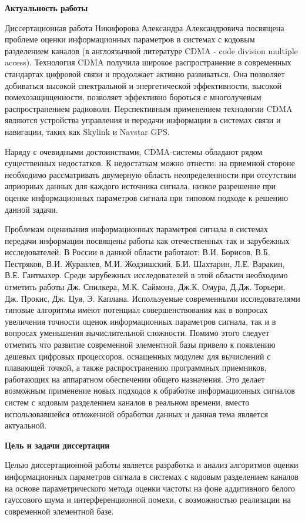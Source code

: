 {\bf{Актуальность работы}}

Диссертационная работа Никифорова Александра Александровича посвящена проблеме оценки информационных параметров в системах с кодовым разделением каналов
(в англоязычной литературе CDMA - code division multiple access).
Технология CDMA получила широкое распространение в современных стандартах цифровой связи и продолжает активно развиваться. Она позволяет добиваться высокой
спектральной и энергетической эффективности, высокой помехозащищенности, позволяет эффективно бороться с многолучевым распространением радиоволн.
Перспективным применением технологии CDMA являются устройства управления и передачи информации в системах связи и навигации, таких как Skylink и Navstar GPS. 

Наряду с очевидными достоинствами, CDMA-системы обладают рядом существенных недостатков. К недостаткам можно отнести: на приемной стороне необходимо рассматривать
двумерную область неопределенности при отсутствии априорных данных для каждого источника сигнала, низкое разрешение при оценке информационных параметров сигнала при типовом подходе
к решению данной задачи.

Проблемам оценивания информационных параметров сигнала в системах передачи информации посвящены работы как отечественных так и зарубежных исследователей.
В России в данной области работают: В.И. Борисов, В.Б. Пестряков, В.И. Журавлев, М.И. Жодзишский,
Б.И. Шахтарин, Л.Е. Варакин, В.Е. Гантмахер.
Среди зарубежных исследователей в этой области необходимо отметить работы Дж. Спилкера, М.К. Саймона, Дж.К. Омура, Д.Дж. Торьери, Дж. Прокис, Дж. Цуя, Э. Каплана.
Используемые современными исследователями типовые алгоритмы имеют потенциал совершенствования как в вопросах увеличения точности оценок
информационных параметров сигнала, так и в вопросах уменьшения вычислительной сложности.
Помимо этого следует отметить что развитие современной элементной базы привело к появлению дешевых цифровых процессоров, оснащенных модулем для вычислений
с плавающей точкой, а также распространению программных приемников, работающих на аппаратном обеспечении общего назначения. Это делает возможным применение новых
подходов к обработке информационных сигналов систем с кодовым разделением каналов в реальном времени, вместо использовавшейся отложенной обработки данных и данная
тема является актуальной.

{\bf{Цель и задачи диссертации}}

Целью диссертационной работы является разработка и анализ алгоритмов оценки информационных параметров сигнала в системах с кодовым разделением каналов на основе
параметрического метода оценки частоты на фоне аддитивного белого гауссового шума и интерференционной помехи,
с возможностью реализации на современной элементной базе.

